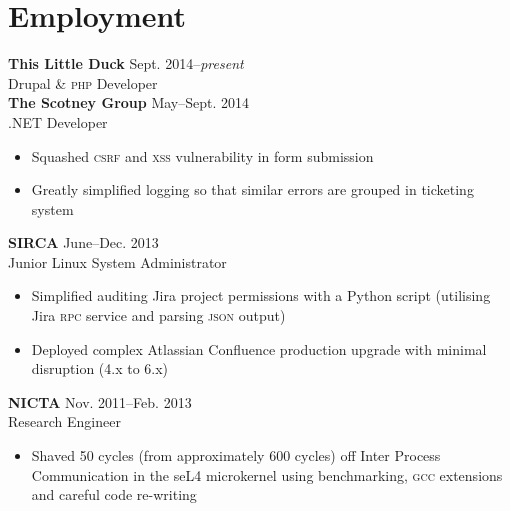 
\vspace{-0.6cm}
\section*{Employment}
\vspace{-0.2cm}

\textbf{This Little Duck} \tabto{7.0cm} {\small Sept. 2014--\textit{present}}\\
Drupal \& \textsc{php} Developer\\

\textbf{The Scotney Group} \tabto{7.0cm} {\small May--Sept. 2014}\\
.NET Developer 
\begin{itemize}
\item Squashed \textsc{csrf} and \textsc{xss} vulnerability in form submission
\item Greatly simplified logging so that similar errors are grouped in 
ticketing system   
\end{itemize}

\textbf{SIRCA} \tabto{7cm} {\small June--Dec. 2013}\\
Junior Linux System Administrator
\begin{itemize}
\item Simplified auditing Jira project permissions with a  
Python script (utilising Jira \textsc{rpc} service and parsing \textsc{json} output)
\item Deployed complex Atlassian Confluence production 
upgrade with minimal disruption (4.x to 6.x)
\end{itemize}

\textbf{NICTA} \tabto{7cm} {\small Nov. 2011--Feb. 2013}\\
Research Engineer
\begin{itemize}
\item Shaved 50 cycles (from approximately 600 cycles) off
Inter Process Communication in the seL4 microkernel using benchmarking, 
\textsc{gcc} extensions and careful code re-writing
\end{itemize}



